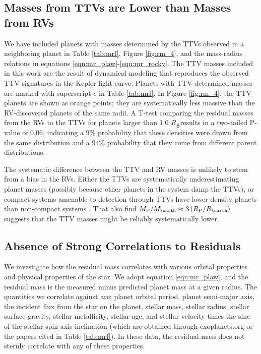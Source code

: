 \documentclass[iop]{emulateapj}
\newcommand{\rpl}{\ensuremath{R_{\rm P}}}
\newcommand{\mpl}{\ensuremath{M_{\rm P}}}
\newcommand{\rearth}{\ensuremath{R_\earth}}
\newcommand{\mearth}{\ensuremath{M_\earth}}
\begin{document}
\subsection{Masses from TTVs are Lower than Masses from RVs}
We have included planets with masses determined by the TTVs observed in a neighboring planet in Table \ref{tab:mrf}, Figure \ref{fig:rm_4}, and the mass-radius relations in equations \ref{eqn:mr_plaw}-\ref{eqn:mr_rocky}.  The TTV masses included in this work are the result of dynamical modeling that reproduces the observed TTV signatures in the Kepler light curve.  Planets with TTV-determined masses are marked with superscript $c$ in Table \ref{tab:mrf}.  In Figure \ref{fig:rm_4}, the TTV planets are shown as orange points; they are systematically less massive than the RV-discovered planets of the same radii.  A T-test comparing the residual masses from the RVs to the TTVs for planets larger than 1.0 \rearth results in a two-tailed P-value of 0.06, indicating a 9\% probability that these densities were drawn from the same distribution and a 94\% probability that they come from different parent distributions.

The systematic difference between the TTV and RV masses is unlikely to stem from a bias in the RVs.  Either the TTVs are systematically underestimating planet masses (possibly because other planets in the system damp the TTVs), or compact systems amenable to detection through TTVs have lower-density planets than non-compact systems \citep[e.g. the Kepler-11 system,][]{Lissauer2013}.  That \citet{WL2013} also find $\mpl/\mearth \approx 3 \left(\rpl/\rearth\right)$ suggests that the TTV masses might be reliably systematically lower.

\subsection{Absence of Strong Correlations to Residuals}
We investigate how the residual mass correlates with various orbital properties and physical properties of the star.  We adopt equation \ref{eqn:mr_plaw}, and the residual mass is the measured minus predicted planet mass at a given radius.  The quantities we correlate against are: planet orbital period, planet semi-major axis, the incident flux from the star on the planet, stellar mass, stellar radius, stellar surface gravity, stellar metallicity, stellar age, and stellar velocity times the sine of the stellar spin axis inclination (which are obtained through exoplanets.org or the papers cited in Table \ref{tab:mrf}).  In these data, the residual mass does not sternly correlate with any of these properties.
\end{document}
